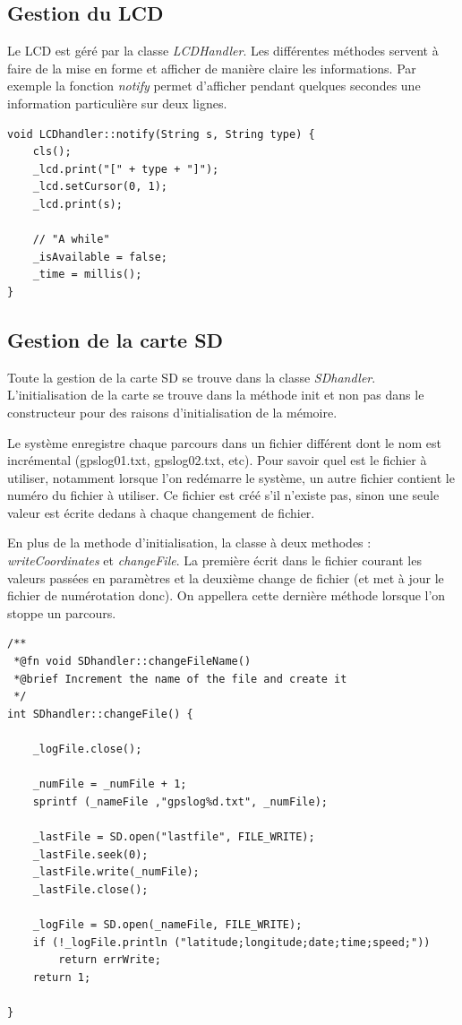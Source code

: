 \documentclass[a4paper,12pt,titlepage]{article}
\begin{document}
\subsection{Gestion du LCD}

Le LCD est géré par la classe \emph{LCDHandler}. Les différentes méthodes servent à faire de la mise en forme et afficher de manière claire les informations.
Par exemple la fonction \emph{notify} permet d'afficher pendant quelques secondes une information particulière sur deux lignes.

\begin{lstlisting}[caption={notify}, label={notify}]
void LCDhandler::notify(String s, String type) {
    cls();
    _lcd.print("[" + type + "]");
    _lcd.setCursor(0, 1);
    _lcd.print(s);

    // "A while"
    _isAvailable = false;
    _time = millis();
}

\end{lstlisting}

\subsection{Gestion de la carte SD}

Toute la gestion de la carte SD se trouve dans la classe \emph{SDhandler}.
L'initialisation de la carte se trouve dans la méthode init et non pas dans le constructeur pour des raisons d'initialisation de la mémoire.

Le système enregistre chaque parcours dans un fichier différent dont le nom est incrémental (gpslog01.txt, gpslog02.txt, etc). 
Pour savoir quel est le fichier à utiliser, notamment lorsque l'on redémarre le système, un autre fichier contient le numéro du fichier à utiliser.
Ce fichier est créé s'il n'existe pas, sinon une seule valeur est écrite dedans à chaque changement de fichier.

En plus de la methode d'initialisation, la classe à deux methodes : \emph{writeCoordinates} et \emph{changeFile}.
La première écrit dans le fichier courant les valeurs passées en paramètres et la deuxième change de fichier (et met à jour le fichier de numérotation donc).
On appellera cette dernière méthode lorsque l'on stoppe un parcours.


\begin{lstlisting}[caption={changeFile}, label={changeFile}]
/**
 *@fn void SDhandler::changeFileName()
 *@brief Increment the name of the file and create it
 */
int SDhandler::changeFile() {

    _logFile.close();

    _numFile = _numFile + 1;
    sprintf (_nameFile ,"gpslog%d.txt", _numFile);

    _lastFile = SD.open("lastfile", FILE_WRITE);
    _lastFile.seek(0);
    _lastFile.write(_numFile);
    _lastFile.close();

    _logFile = SD.open(_nameFile, FILE_WRITE);
    if (!_logFile.println ("latitude;longitude;date;time;speed;"))
        return errWrite;
    return 1;

}
\end{lstlisting}
\end{document}

